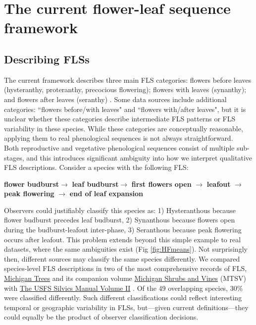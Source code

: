 \documentclass[11pt]{article}
\begin{document}
\section*{The current flower-leaf sequence framework}
\subsection*{Describing FLSs}
\noindent  The current framework describes three main FLS categories: flowers before leaves (hysteranthy, proteranthy, precocious flowering); flowers with leaves (synanthy); and flowers after leaves (seranthy) \citep{Lamont2011, Heinig1899}. Some data sources \citep[e.g.][]{Burns1990,Barnes2004} include additional categories: ``flowers before/with leaves" and ``flowers with/after leaves", but it is unclear whether these categories describe intermediate FLS patterns or FLS variability in these species. While these categories are conceptually reasonable, applying them to real phenological sequences is not always straightforward.\\

\noindent Both reproductive and vegetative phenological sequences consist of multiple sub-stages, and this introduces significant ambiguity into how we interpret qualitative FLS descriptions. Consider a species with the following FLS:\\

\begin{center}
\textbf{flower budburst}$\rightarrow$ \textbf{leaf budburst}$\rightarrow$ \textbf{first flowers open} $\rightarrow$ \textbf{leafout} $\rightarrow$ \textbf{peak flowering} $\rightarrow$ \textbf{end of leaf expansion} \\
\end{center}

\noindent Observers could justifiably classify this species as: 1) Hysteranthous because flower budburst precedes leaf budburst, 2) Synanthous because flowers open during the budburst-leafout inter-phase, 3) Seranthous because peak flowering occurs after leafout. This problem extends beyond this simple example to real datasets, \citep[e.g.][]{OKeefe2015} where the same ambiguities exist (Fig \ref{fig:HFmeans}). Not surprisingly then, different sources may classify the same species differently. We compared species-level FLS descriptions in two of the most comprehensive records of FLS, \underline{Michigan Trees} and its companion volume \underline{Michigan Shrubs and Vines} (MTSV) \citep{Barnes2004,Barnes2016} with \underline{The USFS Silvics Manual Volume II} \citep{Burns1990}. Of the 49 overlapping species, 30\% were classified differently. Such different classifications could reflect interesting temporal or geographic variability in FLSs, but---given current definitions---they could equally be the product of observer classification decisions.\\
\end{document}
